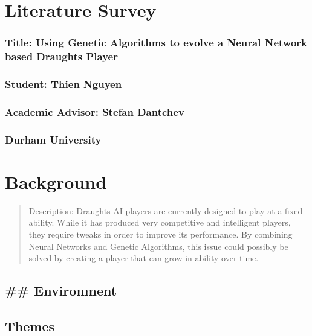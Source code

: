\documentclass[]{article}
\date{}
\begin{document}
\section{Literature Survey}\label{literature-survey}

\subsubsection{Title: Using Genetic Algorithms to evolve a Neural
Network based Draughts
Player}\label{title-using-genetic-algorithms-to-evolve-a-neural-network-based-draughts-player}

\subsubsection{Student: Thien Nguyen}\label{student-thien-nguyen}

\subsubsection{Academic Advisor: Stefan
Dantchev}\label{academic-advisor-stefan-dantchev}

\subsubsection{Durham University}\label{durham-university}

\section{Background}\label{background}

\begin{quote}
Description: Draughts AI players are currently designed to play at a fixed ability. While it has produced very competitive and intelligent
players, they require tweaks in order to improve its performance. By
combining Neural Networks and Genetic Algorithms, this issue could
possibly be solved by creating a player that can grow in ability over
time.
\end{quote}

\subsection{\#\# Environment}\label{environment}

\subsection{Themes}\label{themes}
\end{document}
